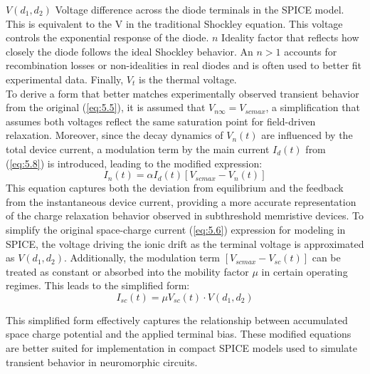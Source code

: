 \noindent $V(d_1,d_2)$ Voltage difference across the diode terminals in the SPICE model. This is equivalent to the V in the traditional Shockley equation. This voltage controls the exponential response of the diode. $n$ Ideality factor that reflects how closely the diode follows the ideal Shockley behavior. An $n>1$ accounts for recombination losses or non-idealities in real diodes and is often used to better fit experimental data. Finally, $V_t$ is the thermal voltage.\\

\noindent To derive a form that better matches experimentally observed transient behavior from the original (\ref{eq:5.5}), it is assumed that $V_{n\infty} = V_{scmax}$, a simplification that assumes both voltages reflect the same saturation point for field-driven relaxation. Moreover, since the decay dynamics of $V_n(t)$ are influenced by the total device current, a modulation term by the main current $I_d(t)$ from (\ref{eq:5.8}) is introduced, leading to the modified expression:
\begin{equation}
I_n(t) = \alpha I_d(t) \left[ V_{scmax} - V_n(t) \right] \label{eq:5.9}
\end{equation}
This equation captures both the deviation from equilibrium and the feedback from the instantaneous device current, providing a more accurate representation of the charge relaxation behavior observed in subthreshold memristive devices. To simplify the original space-charge current (\ref{eq:5.6}) expression for modeling in SPICE, the voltage driving the ionic drift as the terminal voltage is approximated as $V(d_1, d_2)$. Additionally, the modulation term $\left[ V_{scmax} - V_{sc}(t) \right]$ can be treated as constant or absorbed into the mobility factor $\mu$ in certain operating regimes. This leads to the simplified form:
\begin{equation}
I_{sc}(t) = \mu V_{sc}(t) \cdot V(d_1, d_2) \label{eq:5.10}
\end{equation}

\noindent This simplified form effectively captures the relationship between accumulated space charge potential and the applied terminal bias. These modified equations are better suited for implementation in compact SPICE models used to simulate transient behavior in neuromorphic circuits.

